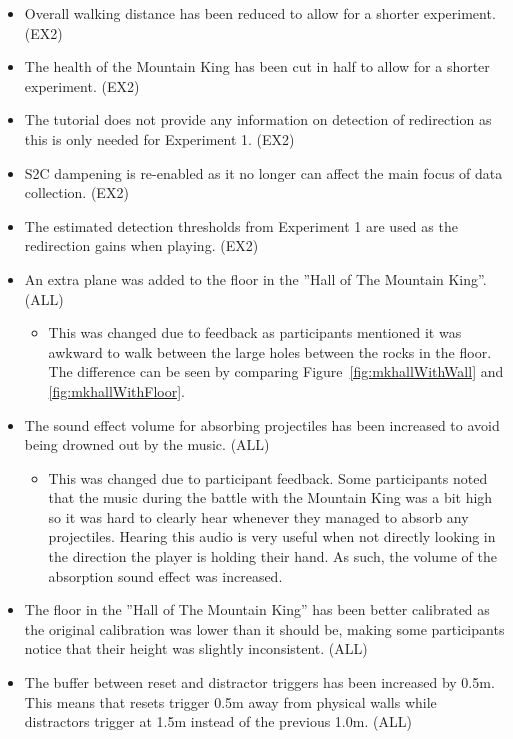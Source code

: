 \begin{itemize}
    \item Overall walking distance has been reduced to allow for a shorter experiment. (EX2)
    \item The health of the Mountain King has been cut in half to allow for a shorter experiment. (EX2)
    \item The tutorial does not provide any information on detection of redirection as this is only needed for Experiment 1. (EX2)
    \item S2C dampening is re-enabled as it no longer can affect the main focus of data collection. (EX2)
    \item The estimated detection thresholds from Experiment 1 are used as the redirection gains when playing. (EX2)
    \item An extra plane was added to the floor in the ''Hall of The Mountain King''. (ALL)
    \begin{itemize}
        \item This was changed due to feedback as participants mentioned it was awkward to walk between the large holes between the rocks in the floor. The difference can be seen by comparing Figure~\ref{fig:mkhallWithWall} and \ref{fig:mkhallWithFloor}.
    \end{itemize}
    \item The sound effect volume for absorbing projectiles has been increased to avoid being drowned out by the music. (ALL)
    \begin{itemize}
        \item This was changed due to participant feedback. Some participants noted that the music during the battle with the Mountain King was a bit high so it was hard to clearly hear whenever they managed to absorb any projectiles. Hearing this audio is very useful when not directly looking in the direction the player is holding their hand. As such, the volume of the absorption sound effect was increased.
    \end{itemize}
    \item The floor in the ''Hall of The Mountain King'' has been better calibrated as the original calibration was lower than it should be, making some participants notice that their height was slightly inconsistent. (ALL)
    \item The buffer between reset and distractor triggers has been increased by 0.5m. This means that resets trigger 0.5m away from physical walls while distractors trigger at 1.5m instead of the previous 1.0m. (ALL)

\end{itemize}
